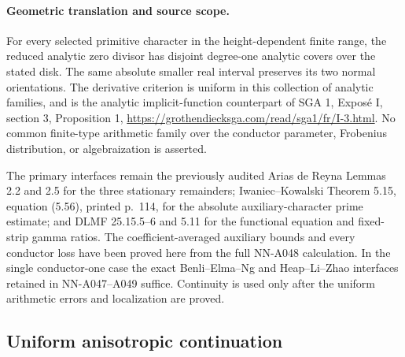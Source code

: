 \paragraph{Geometric translation and source scope.}
For every selected primitive character in the height-dependent
finite range, the reduced analytic zero divisor has disjoint
degree-one analytic covers over the stated disk. The same
absolute smaller real interval preserves its two normal
orientations. The derivative criterion is uniform in this
collection of analytic families, and is the analytic
implicit-function counterpart of SGA 1, Expos\'e I,
section 3, Proposition 1,
\url{https://grothendiecksga.com/read/sga1/fr/I-3.html}.
No common finite-type arithmetic family over the conductor
parameter, Frobenius distribution, or algebraization is asserted.

The primary interfaces remain the previously audited Arias de
Reyna Lemmas 2.2 and 2.5 for the three stationary remainders;
Iwaniec--Kowalski Theorem 5.15, equation (5.56), printed p.~114,
for the absolute auxiliary-character prime estimate; and
DLMF 25.15.5--6 and 5.11 for the functional equation and
fixed-strip gamma ratios. The coefficient-averaged auxiliary
bounds and every conductor loss have been proved here from
the full NN-A048 calculation. In the single conductor-one
case the exact Benli--Elma--Ng and Heap--Li--Zhao interfaces
retained in NN-A047--A049 suffice. Continuity is used only
after the uniform arithmetic errors and localization are proved.


\subsection*{Uniform anisotropic continuation}

